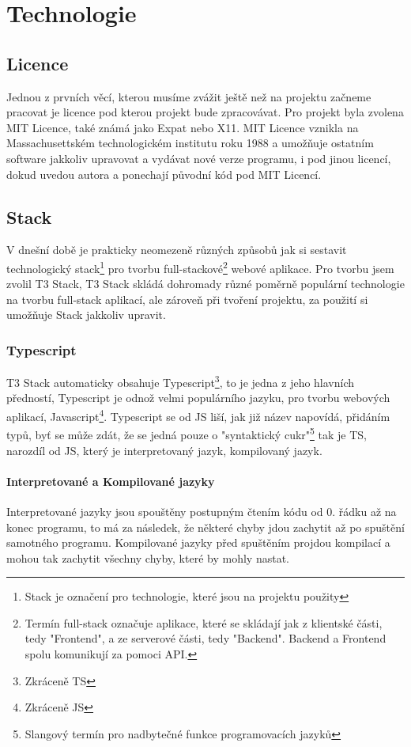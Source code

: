 \chapter{Technologie}
\section{Licence}
Jednou z prvních věcí, kterou musíme zvážit ještě než na projektu začneme pracovat je licence pod kterou projekt bude zpracovávat. Pro projekt byla zvolena MIT Licence, také známá jako Expat nebo X11\cite{GNU-Mit}. MIT Licence vznikla na Massachusettském technologickém institutu roku 1988 a umožňuje ostatním software jakkoliv upravovat a vydávat nové verze programu, i pod jinou licencí, dokud uvedou autora a ponechají původní kód pod MIT Licencí\cite{Github-Mit}.
\section{Stack}
V dnešní době je prakticky neomezeně různých způsobů jak si sestavit technologický stack\footnote{Stack je označení pro technologie, které jsou na projektu použity} pro tvorbu full-stackové\footnote{Termín full-stack označuje aplikace, které se skládají jak z klientské části, tedy "Frontend", a ze serverové části, tedy "Backend". Backend a Frontend spolu komunikují za pomoci API.} webové aplikace.
Pro tvorbu jsem zvolil T3 Stack, T3 Stack skládá dohromady různé poměrně populární technologie na tvorbu full-stack aplikací, ale zároveň při tvoření projektu, za použití  si umožňuje Stack jakkoliv upravit\cite{t3stack}.
\subsection{Typescript}
T3 Stack automaticky obsahuje Typescript\footnote{Zkráceně TS}, to je jedna z jeho hlavních předností, Typescript je odnož velmi populárního jazyku, pro tvorbu webových aplikací, Javascript\footnote{Zkráceně JS}. Typescript se od JS liší, jak již název napovídá, přidáním typů, byť se může zdát, že se jedná pouze o "syntaktický cukr"\footnote{Slangový termín pro nadbytečné funkce programovacích jazyků} tak je TS, narozdíl od JS, který je interpretovaný jazyk, kompilovaný jazyk.
\subsubsection{Interpretované a Kompilované jazyky}
Interpretované jazyky jsou spouštěny postupným čtením kódu od 0. řádku až na konec programu, to má za následek, že některé chyby jdou zachytit až po spuštění samotného programu. Kompilované jazyky před spuštěním projdou kompilací a mohou tak zachytit všechny chyby, které by mohly nastat.

